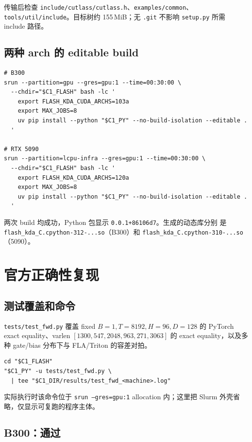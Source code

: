 \documentclass[11pt,a4paper,fontset=none]{ctexart}
\newcommand{\code}[1]{\texttt{#1}}
\begin{document}
传输后检查 \code{include/cutlass/cutlass.h}、\code{examples/common}、
\code{tools/util/include}。目标树约 155\,MiB；无 \code{.git} 不影响
\code{setup.py} 所需 include 路径。

\subsection{两种 arch 的 editable build}

\begin{lstlisting}
# B300
srun --partition=gpu --gres=gpu:1 --time=00:30:00 \
  --chdir="$C1_FLASH" bash -lc '
    export FLASH_KDA_CUDA_ARCHS=103a
    export MAX_JOBS=8
    uv pip install --python "$C1_PY" --no-build-isolation --editable .
  '

# RTX 5090
srun --partition=lcpu-infra --gres=gpu:1 --time=00:30:00 \
  --chdir="$C1_FLASH" bash -lc '
    export FLASH_KDA_CUDA_ARCHS=120a
    export MAX_JOBS=8
    uv pip install --python "$C1_PY" --no-build-isolation --editable .
  '
\end{lstlisting}

两次 build 均成功，Python 包显示 \code{0.0.1+86106d7}。生成的动态库分别
是 \code{flash\_kda\_C.cpython-312-...so}（B300）和
\code{flash\_kda\_C.cpython-310-...so}（5090）。

\section{官方正确性复现}

\subsection{测试覆盖和命令}

\code{tests/test\_fwd.py} 覆盖 fixed
\(B=1,T=8192,H=96,D=128\) 的 PyTorch exact equality、varlen
\([1300,547,2048,963,271,3063]\) 的 exact equality，以及多种 gate/bias
分布下与 FLA/Triton 的容差对拍。

\begin{lstlisting}
cd "$C1_FLASH"
"$C1_PY" -u tests/test_fwd.py \
  | tee "$C1_DIR/results/test_fwd_<machine>.log"
\end{lstlisting}

实际执行时该命令位于 \code{srun --gres=gpu:1} allocation 内；这里把
Slurm 外壳省略，仅显示可复跑的程序主体。

\subsection{B300：通过}
\end{document}
